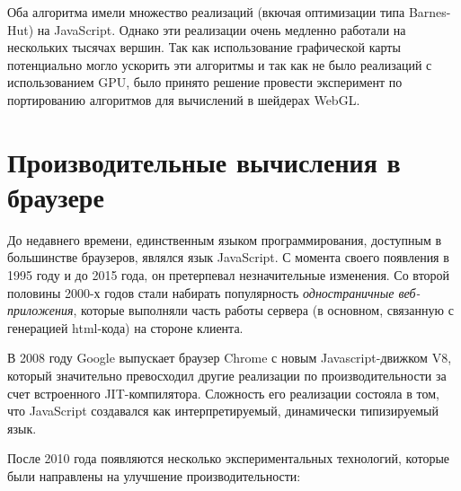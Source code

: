 Оба алгоритма имели множество реализаций (вкючая оптимизации типа Barnes-Hut) на JavaScript. Однако эти реализации очень медленно работали на нескольких тысячах вершин. Так как использование графической карты потенциально могло ускорить эти алгоритмы и так как не было реализаций с использованием GPU, было принято решение провести эксперимент по портированию алгоритмов для вычислений в шейдерах WebGL.

\section{Производительные вычисления в браузере}

До недавнего времени, единственным языком программирования, доступным в большинстве браузеров, являлся язык JavaScript. С момента своего появления в 1995 году и до 2015 года, он претерпевал незначительные изменения. Со второй половины 2000-х годов стали набирать популярность {\itshape одностраничные веб-приложения}, которые выполняли часть работы сервера (в основном, связанную с генерацией html-кода) на стороне клиента.

В 2008 году Google выпускает браузер Chrome с новым Javascript-движком V8, который значительно превосходил другие реализации по производительности за счет встроенного JIT-компилятора. Сложность его реализации состояла в том, что JavaScript создавался как интерпретируемый, динамически типизируемый язык.

После 2010 года появляются несколько экспериментальных технологий, которые были направлены на улучшение производительности:

